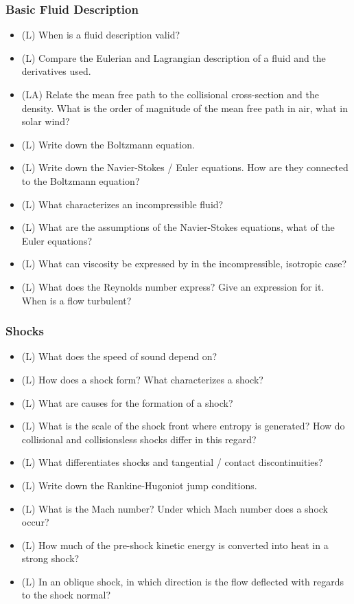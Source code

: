 \subsubsection*{Basic Fluid Description}
\begin{itemize}
    \item (L) When is a fluid description valid?
    \item (L) Compare the Eulerian and Lagrangian description of a fluid and the derivatives used.
    \item (LA) Relate the mean free path to the collisional cross-section and the density. What is the order of
    magnitude of the mean free path in air, what in solar wind?
    \item (L) Write down the Boltzmann equation.
    \item (L) Write down the Navier-Stokes / Euler equations. How are they connected to the Boltzmann equation?
    \item (L) What characterizes an incompressible fluid?
    \item (L) What are the assumptions of the Navier-Stokes equations, what of the Euler equations?
    \item (L) What can viscosity be expressed by in the incompressible, isotropic case?
    \item (L) What does the Reynolds number express? Give an expression for it. When is a flow turbulent?
\end{itemize}

\subsubsection*{Shocks}
\begin{itemize}
    \item (L) What does the speed of sound depend on?
    \item (L) How does a shock form? What characterizes a shock?
    \item (L) What are causes for the formation of a shock?
    \item (L) What is the scale of the shock front where entropy is generated? How do collisional
    and collisionsless shocks differ in this regard?
    \item (L) What differentiates shocks and tangential / contact discontinuities?
    \item (L) Write down the Rankine-Hugoniot jump conditions.
    \item (L) What is the Mach number? Under which Mach number does a shock occur?
    \item (L) How much of the pre-shock kinetic energy is converted into heat in a strong shock?
    \item (L) In an oblique shock, in which direction is the flow deflected with regards to the shock normal?
\end{itemize}

